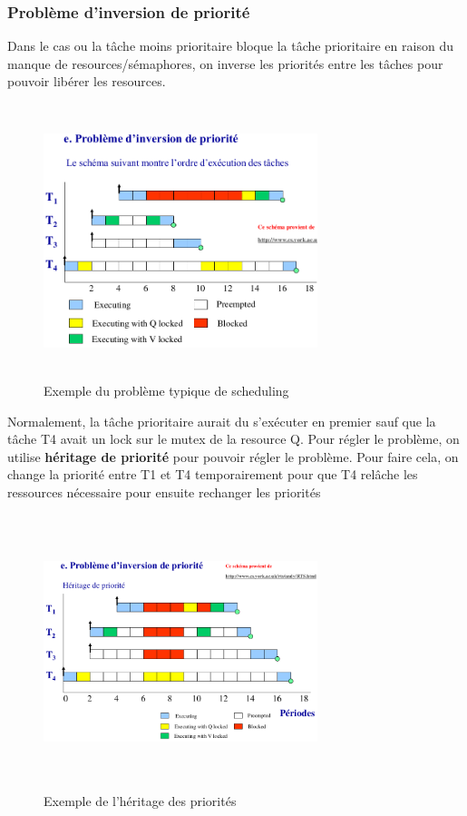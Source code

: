 \documentclass[oneside]{book}
\begin{document}
    \subsubsection{Problème d'inversion de priorité}
    Dans le cas ou la tâche moins prioritaire bloque la tâche prioritaire en raison du manque de resources/sémaphores, on inverse les priorités entre les tâches pour pouvoir libérer les resources.\\
    
    \begin{figure}[!ht]
    	\centering
    	\includegraphics[width=8cm, height = 8cm, keepaspectratio]{Images/prob_scheduling.png}
    	\caption{Exemple du problème typique de scheduling}
    	\label{fig:Scheduling}
    \end{figure}
    
    Normalement, la tâche prioritaire aurait du s'exécuter en premier sauf que la tâche T4 avait un lock sur le mutex de la resource Q. Pour régler le problème, on utilise \textbf{héritage de priorité} pour pouvoir régler le problème. Pour faire cela, on change la priorité entre T1 et T4 temporairement pour que T4 relâche les ressources nécessaire pour ensuite rechanger les priorités\\
    
    \begin{figure}[!ht]
    	\centering
    	\includegraphics[width=8cm, height = 8cm, keepaspectratio]{Images/heritage_priorite.png}
    	\caption{Exemple de l'héritage des priorités}
    	\label{fig:HeritagePriorite}
    \end{figure}
    
\end{document}
